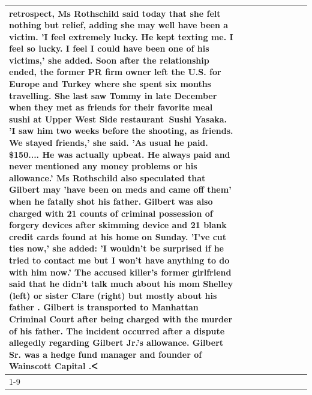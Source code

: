 \begin{table}[H]
\begin{tabular}{lllrlllll}
retrospect, Ms Rothschild said today that she felt nothing but relief, adding she may well have been a victim. 'I feel extremely lucky. He kept texting me. I feel so lucky. I feel I could have been one of his victims,' she added. Soon after the relationship ended, the former PR firm owner left the U.S. for Europe and Turkey where she spent six months  travelling. She last saw Tommy in late December when they met as friends for their favorite meal sushi at Upper West Side restaurant Sushi Yasaka. 'I saw him two weeks before the shooting, as friends. We stayed friends,' she said. 'As usual he paid. \$150.... He was actually upbeat. He always paid and never mentioned any money problems or his allowance.' Ms Rothschild also speculated that Gilbert may 'have been on meds and came off them' when he fatally shot his father. Gilbert was also charged with 21 counts of criminal possession of forgery devices after skimming device and 21 blank credit cards found at his home on Sunday. 'I've cut ties now,' she added: 'I wouldn’t be surprised if he tried to contact me but I won’t have anything to do with him now.' The accused killer's former girlfriend said that he didn't talk much about his mom Shelley (left) or sister Clare (right) but mostly about his father . Gilbert is transported to Manhattan Criminal Court  after being charged with the murder of his father. The incident occurred after a dispute allegedly regarding Gilbert Jr.'s allowance. Gilbert Sr. was a hedge fund manager and founder of Wainscott Capital .ᐸ \\
\cline{1-9} \cline{2-9}

\end{tabular}
\end{table}
